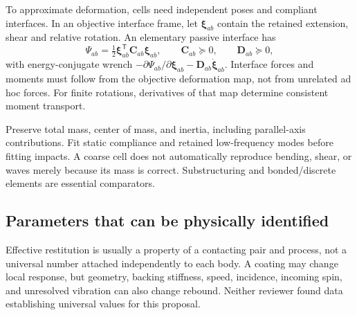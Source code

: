 \documentclass[11pt,a4paper]{article}
\newcommand{\bv}[1]{\bm{#1}}\newcommand{\inertia}{\mathbb I}
\begin{document}
To approximate deformation, cells need independent poses and compliant interfaces. In an objective interface frame, let $\bv\xi_{ab}$ contain the retained extension, shear and relative rotation. An elementary passive interface has
\begin{equation}
\Psi_{ab}=\tfrac12\bv\xi_{ab}^{\mathsf T}\bv C_{ab}\bv\xi_{ab},
\qquad \bv C_{ab}\succeq0,\qquad\bv D_{ab}\succeq0,
\end{equation}
with energy-conjugate wrench $-\partial\Psi_{ab}/\partial\bv\xi_{ab}-\bv D_{ab}\dot{\bv\xi}_{ab}$. Interface forces and moments must follow from the objective deformation map, not from unrelated ad hoc forces. For finite rotations, derivatives of that map determine consistent moment transport.

Preserve total mass, center of mass, and inertia, including parallel-axis contributions. Fit static compliance and retained low-frequency modes before fitting impacts. A coarse cell does not automatically reproduce bending, shear, or waves merely because its mass is correct. Substructuring \cite{craig} and bonded/discrete elements \cite{potyondy} are essential comparators.

\subsection{Parameters that can be physically identified}
Effective restitution is usually a property of a contacting pair and process, not a universal number attached independently to each body. A coating may change local response, but geometry, backing stiffness, speed, incidence, incoming spin, and unresolved vibration can also change rebound. Neither reviewer found data establishing universal values for this proposal.
\end{document}
